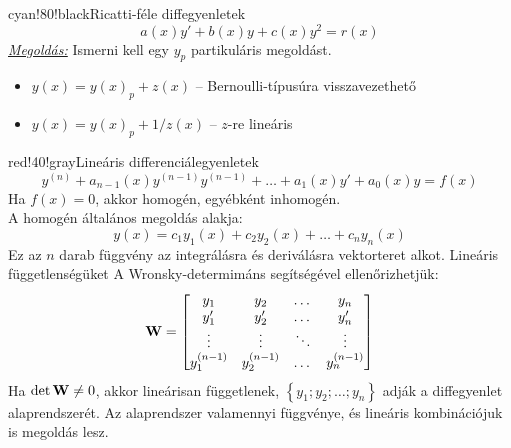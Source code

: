 \documentclass[main.tex]{subfiles}
\begin{document}
\begin{cbox}{cyan!80!black}{Ricatti-féle diffegyenletek}
  \[
    a(x) y' + b(x) y + c(x) y^2 = r(x)
  \]
  \emph{\underline{Megoldás:}}
  \quad Ismerni kell egy $y_p$ partikuláris megoldást.
  \begin{itemize}
    \item $y(x) = y(x)_p + z(x)$
          \tabto{4.4cm} – \tabto{5cm}
          Bernoulli-típusúra visszavezethető

    \item $y(x) = y(x)_p + 1/z(x)$
          \tabto{4.4cm} – \tabto{5cm}
          $z$-re lineáris
  \end{itemize}
\end{cbox}

\begin{cbox}{red!40!gray}{Lineáris differenciálegyenletek}
  \[
    y^{(n)}
    + a_{n-1}(x) y^{(n-1)} y^{(n-1)}
    + \dots
    + a_1(x) y'
    + a_0(x) y
    = f(x)
  \]
  Ha $f(x) = 0$, akkor homogén, egyébként inhomogén.
  \\[2mm]
  A homogén általános megoldás alakja:
  \[
    y(x)
    = c_1 y_1(x)
    + c_2 y_2(x)
    + \dots
    + c_n y_n(x)
  \]
  Ez az $n$ darab függvény az integrálásra és
  deriválásra vektorteret alkot. Lineáris függetlenségüket
  A Wronsky-determimáns segítségével ellenőrizhetjük:
  \[
    \mathbf{W} = \begin{bmatrix}
      y_1         & y_2         & \dots  & y_n         \\
      y_1'        & y_2'        & \dots  & y_n'        \\
      \vdots      & \vdots      & \ddots & \vdots      \\
      y_1^{(n-1)} & y_2^{(n-1)} & \dots  & y_n^{(n-1)} \\
    \end{bmatrix}
  \]
  Ha $\det \mathbf{W} \neq 0$, akkor lineárisan függetlenek,
  $\left\{ y_1; y_2; \dots; y_n \right\}$ adják a diffegyenlet
  alaprendszerét. Az alaprendszer valamennyi függvénye, és
  lineáris kombinációjuk is megoldás lesz.
\end{cbox}
\end{document}
